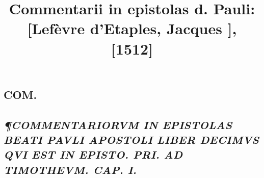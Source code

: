 \documentclass{article}
\begin{document}
\date{}
        \title{Commentarii in epistolas d. Pauli: [Lefèvre d'Etaples, Jacques ], [1512]}
\maketitle
\tableofcontents
\clearpage
\begin{pages} 
\beginnumbering
        
\section*{COM. }
\marginpar{[ p.]}
{}
\subsection*{\textit{¶COMMENTARIORVM IN EPISTOLAS BEATI PAVLI APOSTOLI LIBER DECIMVS QVI EST IN EPISTO. PRI. AD TIMOTHEVM. CAP. I. }}

\end{pages}
\end{document}

